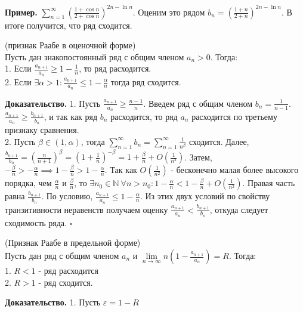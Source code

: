 \textbf{Пример.} $\sum\limits_{n=1}^{\infty}\left(\frac{1+\cos{n}}{2+\cos{n}}
\right)^{2n-\ln{n}}$. Оценим это рядом $b_n=\left(\frac{1+n}{2+n}\right)^{2n
-\ln{n}}$. В итоге получится, что ряд сходится.
\begin{theor}
    (признак Раабе в оценочной форме)\\
    Пусть дан знакопостоянный ряд с общим членом $a_n>0$. Тогда:\\
    1. Если $\frac{a_{n+1}}{a_n}\geqslant1-\frac{1}{n}$, то ряд расходится.\\
2. Если $\exists \alpha>1: \frac{a_{n+1}}{a_n}\leqslant 1-\frac{\alpha}{n}$
тогда ряд сходится. 
\end{theor}
\textbf{Доказательство.}  
1. Пусть $\frac{a_{n+1}}{a_n}\geqslant \frac{n-1}{n}$.
Введем ряд с общим членом $b_n=\frac{1}{n-1}$. 
$\frac{a_{n+1}}{a_n}\geqslant\frac{b_{n+1}}{b_n}$, 
и так как ряд $b_n$ расходится, то ряд $a_n$ расходится по третьему 
признаку сравнения.\\
2. Пусть  $\beta\in(1,\alpha)$, тогда $\sum\limits_{n=1}^{\infty} b_n=
\sum\limits_{n=1}^{\infty} \frac{1}{n^\beta}$ сходится. Далее,
$\frac{b_{n+1}}{b_n}=(\frac{n}{n+1})^\beta=(1+\frac{1}{n})^{-\beta}=
1+\frac{\beta}{n}+O(\frac{1}{n^2})$. Затем, $- \frac{\beta}{n}>- 
\frac{\alpha}{n}\implies 1-\frac{\beta}{n}>1-\frac{\alpha}{n}$.
Так как $O(\frac{1}{n^2})$ - бесконечно малая более высокого порядка, чем 
$\frac{\alpha}{n}$ и $\frac{\beta}{n}$, то $\exists n_0\in\mathbb{N}~\forall
n>n_0:1-\frac{\alpha}{n}<1-\frac{\beta}{n}+O(\frac{1}{n^2})$. Правая часть
равна $\frac{b_{n+1}}{b_n}$. По условию, $\frac{a_{n+1}}{a_n}\leqslant 
1-\frac{\alpha}{n}$. Из этих двух условий по свойству транзитивности 
неравенств получаем оценку $\frac{a_{n+1}}{a_n}<\frac{b_{n+1}}{b_n}$, откуда 
следует сходимость ряда. $\square$ 
\begin{theor}
    (Признак Раабе в предельной форме)\\
    Пусть дан ряд с общим членом $a_n$ и
    $\lim\limits_{n \to \infty}n(1-\frac{a_{n+1}}{a_n})=R$. 
    Тогда:\\
    1. $R<1$ - ряд расходится\\
    2. $R>1$ - ряд сходится. 
\end{theor}
\textbf{Доказательство.} 
1. Пусть $\varepsilon=1-R$


